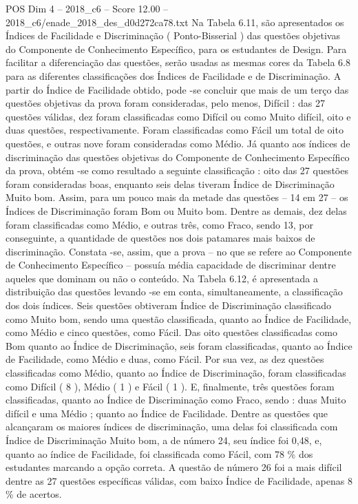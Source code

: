 \begin{textsample}{POS Dim 4 – 2018\_c6 – Score 12.00 – 2018\_c6/enade\_2018\_des\_d0d272ca78.txt}
Na Tabela 6.11, são apresentados os Índices de Facilidade e Discriminação ( Ponto-Bisserial ) das questões objetivas do Componente de Conhecimento Específico, para os estudantes de Design.
Para facilitar a diferenciação das questões, serão usadas as mesmas cores da Tabela 6.8 para as diferentes classificações dos Índices de Facilidade e de Discriminação.
A partir do Índice de Facilidade obtido, pode -se concluir que mais de um terço das questões objetivas da prova foram consideradas, pelo menos, Difícil : das 27 questões válidas, dez foram classificadas como Difícil ou como Muito difícil, oito e duas questões, respectivamente.
Foram classificadas como Fácil um total de oito questões, e outras nove foram consideradas como Médio.
Já quanto aos índices de discriminação das questões objetivas do Componente de Conhecimento Específico da prova, obtém -se como resultado a seguinte classificação : oito das 27 questões foram consideradas boas, enquanto seis delas tiveram Índice de Discriminação Muito bom.
Assim, para um pouco mais da metade das questões – 14 em 27 – os Índices de Discriminação foram Bom ou Muito bom.
Dentre as demais, dez delas foram classificadas como Médio, e outras três, como Fraco, sendo 13, por conseguinte, a quantidade de questões nos dois patamares mais baixos de discriminação.
Constata -se, assim, que a prova – no que se refere ao Componente de Conhecimento Específico – possuía média capacidade de discriminar dentre aqueles que dominam ou não o conteúdo.
Na Tabela 6.12, é apresentada a distribuição das questões levando -se em conta, simultaneamente, a classificação dos dois índices.
Seis questões obtiveram Índice de Discriminação classificado como Muito bom, sendo uma questão classificada, quanto ao Índice de Facilidade, como Médio e cinco questões, como Fácil.
Das oito questões classificadas como Bom quanto ao Índice de Discriminação, seis foram classificadas, quanto ao Índice de Facilidade, como Médio e duas, como Fácil.
Por sua vez, as dez questões classificadas como Médio, quanto ao Índice de Discriminação, foram classificadas como Difícil ( 8 ), Médio ( 1 ) e Fácil ( 1 ).
E, finalmente, três questões foram classificadas, quanto ao Índice de Discriminação como Fraco, sendo : duas Muito difícil e uma Médio ; quanto ao Índice de Facilidade.
Dentre as questões que alcançaram os maiores índices de discriminação, uma delas foi classificada com Índice de Discriminação Muito bom, a de número 24, seu índice foi 0,48, e, quanto ao índice de Facilidade, foi classificada como Fácil, com 78 \% dos estudantes marcando a opção correta.
A questão de número 26 foi a mais difícil dentre as 27 questões específicas válidas, com baixo Índice de Facilidade, apenas 8 \% de acertos.

\end{textsample}

